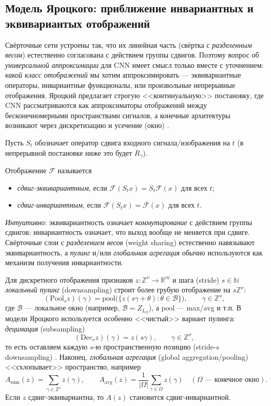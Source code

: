 \documentclass[../NDCNNAI_main.tex]{subfiles}
\begin{document}
\subsection{Модель Яроцкого: приближение инвариантных и эквивариантых отображений}
Свёрточные сети устроены так, что их линейная часть (свёртка с \emph{разделенным весом})
естественно согласована с действием группы сдвигов.
Поэтому вопрос об \emph{универсальной аппроксимации} для CNN имеет смысл только вместе с уточнением:
\emph{какой класс отображений} мы хотим аппроксимировать --- эквивариантные операторы, инвариантные функционалы,
или произвольные непрерывные отображения. Яроцкий предлагает строгую <<континуальную>> постановку, где CNN рассматриваются как аппроксиматоры отображений
между бесконечномерными пространствами сигналов, а конечные архитектуры возникают через дискретизацию и усечение
(окно) \cite{Yarotsky2018}.

Пусть $S_t$ обозначает оператор сдвига входного сигнала/изображения на $t$ (в непрерывной постановке ниже это будет $R_\gamma$).
\begin{definition}
Отображение $\mathcal{F}$ называется
\begin{itemize}
  \item \emph{сдвиг-эквивариантным}, если $\mathcal{F}(S_t x)=S_t \mathcal{F}(x)$ для всех $t$;
  \item \emph{сдвиг-инвариантным}, если $\mathcal{F}(S_t x)=\mathcal{F}(x)$ для всех $t$.
\end{itemize}
\end{definition}

\textit{Интуитивно}: эквивариантность означает \emph{коммутирование} с действием группы сдвигов; инвариантность означает, что выход вообще не меняется при сдвиге.
Свёрточные слои с \emph{разделением весов} (weight sharing) естественно навязывают эквивариантность, а \emph{пулинг} и/или \emph{глобальная агрегация} обычно используются как механизм получения инвариантности.

Для дискретного отображения признаков $z\colon\mathbb{Z}^\nu\to\mathbb{R}^m$ и шага (stride) $s\in\mathbb{N}$ \emph{локальный пулинг} (downsampling) строит более грубую отображение на $s\mathbb{Z}^\nu$:
\[
(\mathrm{Pool}_s z)(\gamma)=\mathrm{pool}\big(\{z(s\gamma+\theta):\theta\in\mathcal{B}\}\big),\qquad \gamma\in\mathbb{Z}^\nu,
\]
где $\mathcal{B}$ --- локальное окно (например, $\mathcal{B}=Z_{L_{\mathrm{rf}}}$), а $\mathrm{pool}$ --- max/avg и т.п.
В модели Яроцкого используется особенно <<чистый>> вариант пулинга: \emph{децимация} (subsampling)
\[
(\mathrm{Dec}_s z)(\gamma)=z(s\gamma),\qquad \gamma\in\mathbb{Z}^\nu,
\]
то есть оставляем каждую $s$-ю пространственную позицию (stride-$s$ downsampling) \cite{Yarotsky2018}.
Наконец, \emph{глобальная агрегация} (global aggregation/pooling) <<схлопывает>> пространство, например
\[
A_{\mathrm{sum}}(z)=\sum_{\gamma\in\mathbb{Z}^\nu} z(\gamma),\qquad
A_{\mathrm{avg}}(z)=\frac{1}{|\Omega|}\sum_{\gamma\in\Omega} z(\gamma)
\quad (\Omega \text{ --- конечное окно}).
\]
Если $z$ сдвиг-эквивариантна, то $A(z)$ становится сдвиг-инвариантной.
\end{document}
